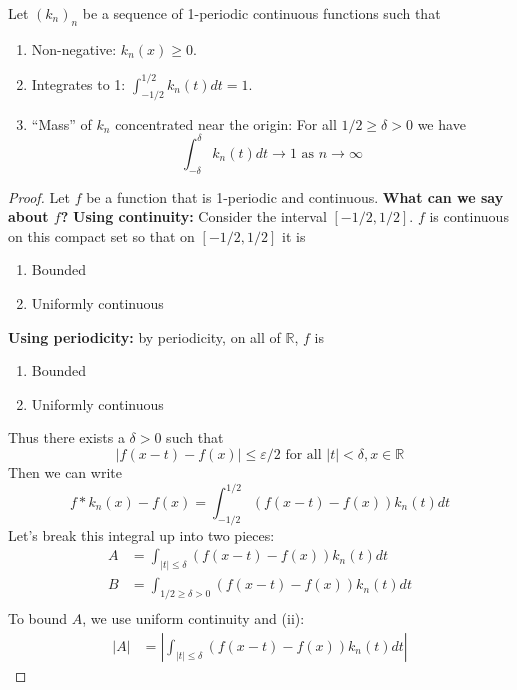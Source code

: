 \documentclass[11pt]{article}
\numberwithin{equation}{section}
\theoremstyle{definition}
\theoremstyle{definition}
\newcommand\parens[1]{\left( #1 \right)}
\newcommand\abs[1]{\left| #1 \right|}
\newcommand{\1}{\mathbbm 1}
\def\d{\delta}
\newcommand{\e}{\varepsilon}
\newcommand{\RR}{\mathbb R}
\begin{document}
\begin{theorem}
	Let $(k_n)_n$ be a sequence of 1-periodic continuous functions such that
	\begin{enumerate}
		\item Non-negative: $k_n(x) \geq 0$.
		\item Integrates to 1: $\int_{-1/2}^{1/2} k_n(t) dt = 1$.
		\item ``Mass'' of $k_n$ concentrated near the origin: For all $1/2 \geq \d > 0$ we have
		\begin{equation}
			\int_{-\d}^\d k_n(t) dt \to 1 \text{ as } n \to \infty
		\end{equation}
	\end{enumerate}
\end{theorem}
\begin{proof}
	Let $f$ be a function that is 1-periodic and continuous. \textbf{What can we say about $f$?} \textbf{Using continuity:} Consider the interval $[-1/2,1/2]$. $f$ is continuous on this compact set so that  on $[-1/2,1/2]$ it is
	\begin{enumerate}
		\item Bounded
		\item Uniformly continuous
	\end{enumerate}
	\textbf{Using periodicity:} by periodicity, on all of $\RR$, $f$ is 
	\begin{enumerate}
		\item Bounded
		\item Uniformly continuous
	\end{enumerate}
	Thus there exists a $\d > 0$ such that
	\begin{equation}
		\abs{f(x-t)-f(x)} \leq \e/2 \text{ for all } |t| < \d, x \in \RR
	\end{equation}
	Then we can write 
	\begin{equation}
		f * k_n(x) - f(x) = \int_{-1/2}^{1/2} \parens{f(x-t) - f(x)} k_n(t) dt 
	\end{equation}
	Let's break this integral up into two pieces:
	\begin{align*}
		A &= \int_{|t| \leq \d } \parens{f(x-t) - f(x)} k_n(t) dt \\
		B &= \int_{1/2 \geq \d > 0} \parens{f(x-t) - f(x)} k_n(t) dt \\
	\end{align*}
	To bound $A$, we use uniform continuity and (ii):
	\begin{align*}
		|A| &= \abs{\int_{|t| \leq \d } \parens{f(x-t) - f(x)} k_n(t) dt}
	\end{align*}
	
\end{proof} 
\end{document}
